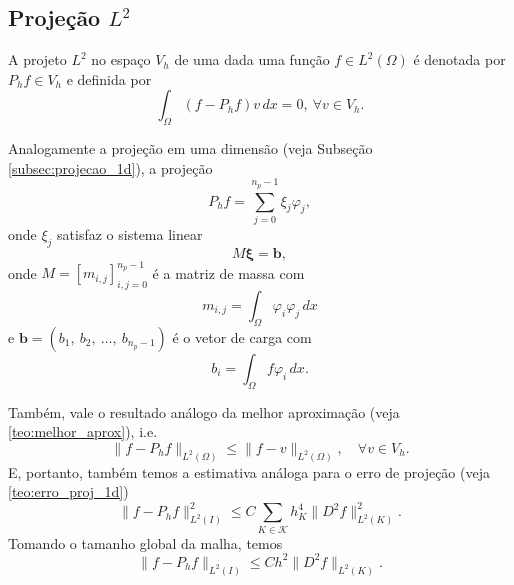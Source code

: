 \subsection{Projeção $L^2$}

A projeto $L^2$ no espaço $V_h$ de uma dada uma função $f\in L^2(\Omega)$  é denotada por $P_hf\in V_h$ e definida por
\begin{equation}
  \int_\Omega (f-P_hf)v\,dx = 0,~\forall v\in V_h.
\end{equation}

Analogamente a projeção em uma dimensão (veja Subseção \ref{subsec:projecao_1d}), a projeção
\begin{equation}
  P_h f = \sum_{j=0}^{n_p-1} \xi_j\varphi_j,
\end{equation}
onde $\xi_j$ satisfaz o sistema linear
\begin{equation}
  M\pmb{\xi} = \pmb{b},
\end{equation}
onde $M = [m_{i,j}]_{i,j=0}^{n_p-1}$ é a matriz de massa com
\begin{equation}
  m_{i,j} = \int_{\Omega} \varphi_i\varphi_j\,dx
\end{equation}
e $\pmb{b} = (b_1,~b_2,~\dotsc,~b_{n_p-1})$ é o vetor de carga com
\begin{equation}
  b_i = \int_\Omega f\varphi_i\,dx.
\end{equation}

Também, vale o resultado análogo da melhor aproximação (veja \ref{teo:melhor_aprox}), i.e.
\begin{equation}
  \|f-P_hf\|_{L^2(\Omega)} \leq \|f - v\|_{L^2(\Omega)},\quad\forall v\in V_h.
\end{equation}
E, portanto, também temos a estimativa análoga para o erro de projeção (veja \ref{teo:erro_proj_1d})
\begin{equation}
  \|f-P_hf\|_{L^2(I)}^2 \leq C\sum_{K\in\mathcal{K}} h_K^4\|D^2 f\|_{L^2(K)}^2.
\end{equation}
Tomando o tamanho global da malha, temos
\begin{equation}
  \|f-P_hf\|_{L^2(I)} \leq Ch^2\|D^2 f\|_{L^2(K)}.
\end{equation}



\emconstrucao